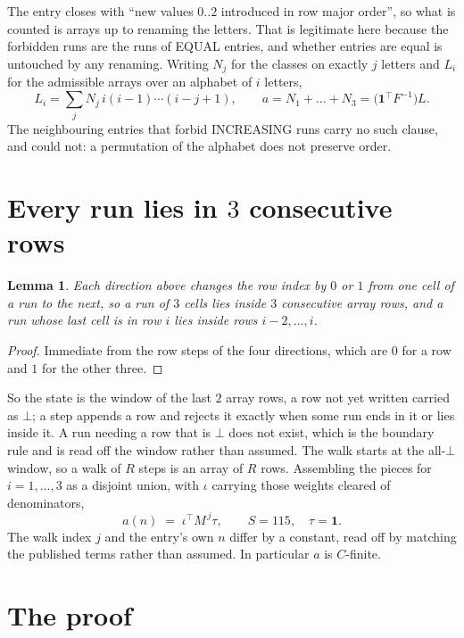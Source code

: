 \documentclass[11pt,a4paper]{article}
\theoremstyle{plain}
\newtheorem{lemma}[theorem]{Lemma}
\theoremstyle{definition}
\begin{document}
The entry closes with ``new values $0..2$ introduced in row major order'', so what is counted
is arrays up to renaming the letters. That is legitimate here because the forbidden runs are
the runs of EQUAL entries, and whether entries are equal is untouched by any renaming. Writing
$N_j$ for the classes on exactly $j$ letters and $L_i$ for the admissible arrays over an
alphabet of $i$ letters,
\[
L_i=\sum_j N_j\,i(i-1)\cdots(i-j+1),\qquad
a=N_1+\dots+N_{3}=\bigl(\mathbf{1}^{\!\top}F^{-1}\bigr)L .
\]
The neighbouring entries that forbid INCREASING runs carry no such clause, and could not: a
permutation of the alphabet does not preserve order.

\section{Every run lies in $3$ consecutive rows}

\begin{lemma}\label{lem:win}
Each direction above changes the row index by $0$ or $1$ from one cell of a run to the next, so
a run of $3$ cells lies inside $3$ consecutive array rows, and a run whose last cell is in
row $i$ lies inside rows $i-2,\dots,i$.
\end{lemma}

\begin{proof}
Immediate from the row steps of the four directions, which are $0$ for a row and $1$ for the
other three.
\end{proof}

So the state is the window of the last $2$ array rows, a row not yet written carried as
$\bot$; a step appends a row and rejects it exactly when some run ends in it or lies inside it.
A run needing a row that is $\bot$ does not exist, which is the boundary rule and is read off
the window rather than assumed. The walk starts at the all-$\bot$ window, so a walk of $R$ steps
is an array of $R$ rows. Assembling the pieces for $i=1,\dots,3$ as a disjoint union, with $\iota$ carrying those weights cleared of denominators,
\[
a(n)\;=\;\iota^{\!\top}M^{\,j}\tau ,\qquad S=115,\quad\tau=\mathbf{1} .
\]
The walk index $j$ and the entry's own $n$ differ by a constant, read off by matching the
published terms rather than assumed. In particular $a$ is $C$-finite.

\section{The proof}
\end{document}
